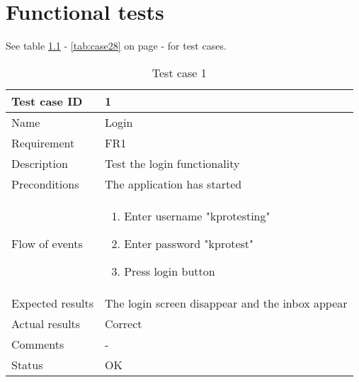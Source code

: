 \chapter{Functional tests}\label{ch:funtest}
		See table \ref{tab:case1} - \ref{tab:case28} on page \pageref{tab:case1} - \pageref{tab:case28} for test cases.
		\begin{table}[h!]
			\begin{tabular}{l|p{10cm}}
				Test case ID & 1 \\ \hline
				Name & Login\\ \hline
				Requirement & FR1\\ \hline
				Description & Test the login functionality\\ \hline
				Preconditions & The application has started\\ \hline
				Flow of events & 
					\begin{enumerate}
						\item{}Enter username "kprotesting"
						\item{}Enter password "kprotest"
						\item{}Press login button
					\end{enumerate} \\ \hline
				Expected results & The login screen disappear and the inbox appear\\ \hline
				Actual results & Correct\\ \hline
				Comments & -\\ \hline
				Status & OK\\ \hline
			\end{tabular}
			\caption{Test case 1} \label{tab:case1}
		\end{table}

